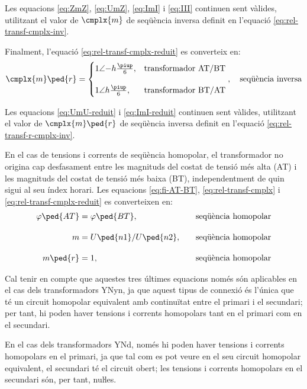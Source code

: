 Les equacions \eqref{eq:ZmZ}, \eqref{eq:UmZ}, \eqref{eq:ImI} i \eqref{eq:III} continuen sent vàlides, utilitzant el valor de $\cmplx{m}$ de seqüència inversa definit en l'equació \eqref{eq:rel-transf-cmplx-inv}.

Finalment, l'equació \eqref{eq:rel-transf-cmplx-reduit} es converteix en:
\begin{equation}\label{eq:rel-transf-r-cmplx-inv}
\cmplx{m}\ped{r}  = 
\begin{cases}
      1\angle{-h}\frac{\piup}{6}, & \text{transformador AT/BT}\\[2.7ex]
      1\angle h\frac{\piup}{6}, & \text{transformador BT/AT}
\end{cases},
\quad\text{seqüència inversa}
\end{equation}

Les equacions \eqref{eq:UmU-reduit} i \eqref{eq:ImI-reduit} continuen sent vàlides, utilitzant el valor de $\cmplx{m}\ped{r}$ de seqüència inversa definit en l'equació \eqref{eq:rel-transf-r-cmplx-inv}.

En el cas de tensions i corrents de seqüència homopolar, el transformador no  origina cap desfasament entre les magnituds  del costat de tensió més alta (AT) i les magnituds del costat de tensió més baixa (BT), independentment de quin sigui al seu índex horari. Les equacions \eqref{eq:fi-AT-BT}, \eqref{eq:rel-transf-cmplx} i \eqref{eq:rel-transf-cmplx-reduit} es converteixen en:
\begin{alignat}{3}
  \varphi\ped{AT} &= \varphi\ped{BT}, &&\quad\text{seqüència homopolar} \\[1em]
  m &= U\ped{n1}/U\ped{n2}, &&\quad\text{seqüència homopolar}\label{eq:rel-transf-cmplx-hom} \\[1em]
  m\ped{r} &= 1, &&\quad\text{seqüència homopolar}
\end{alignat}

Cal tenir en compte que aquestes tres últimes equacions  només són aplicables en el cas dels transformadors YNyn, ja que aquest tipus de connexió és l'única que té un circuit homopolar equivalent amb continuïtat entre el primari i el secundari; per tant, hi poden haver tensions i corrents homopolars tant en el primari com en el secundari.

En el cas dels transformadors YNd, només hi poden haver tensions i corrents homopolars en el primari, ja que tal com es pot veure en el seu circuit homopolar equivalent, el secundari té el circuit obert; les tensions i corrents homopolars en el secundari són, per tant, nuŀles.



